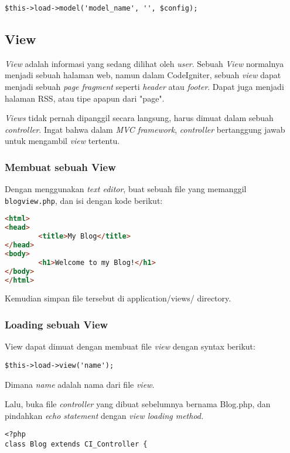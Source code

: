 \begin{enumerate}
\begin{lstlisting}[label=phpheg, frame=single]
$this->load->model('model_name', '', $config);
\end{lstlisting}


\subsection{View}
\label{subs:view}
\textit{View} adalah informasi yang sedang dilihat oleh \textit{user}. Sebuah \textit{View} normalnya menjadi sebuah halaman web, namun dalam CodeIgniter, sebuah \textit{view} dapat menjadi sebuah \textit{page fragment} seperti \textit{header} atau \textit{footer}. Dapat juga menjadi halaman RSS, atau tipe apapun dari "page".

\textit{Views} tidak pernah dipanggil secara langsung, harus dimuat dalam sebuah \textit{controller}. Ingat bahwa dalam \textit{MVC framework}, \textit{controller} bertanggung jawab untuk mengambil \textit{view} tertentu. 

\subsubsection{Membuat sebuah View}
\label{sssec:view_1}
Dengan menggunakan \textit{text editor}, buat sebuah file yang memanggil \verb|blogview.php|, dan isi dengan kode berikut:
\begin{lstlisting}[frame=single, language=html]% 
<html>
<head>
        <title>My Blog</title>
</head>
<body>
        <h1>Welcome to my Blog!</h1>
</body>
</html>
\end{lstlisting}

Kemudian simpan file tersebut di application/views/ directory.

\subsubsection{Loading sebuah View}
\label{sssec:view_1}

View dapat dimuat dengan membuat file \textit{view} dengan syntax berikut:

\begin{lstlisting}[frame=single] 
$this->load->view('name');
\end{lstlisting}

Dimana \textit{name} adalah nama dari file \textit{view}.

Lalu, buka file \textit{controller} yang dibuat sebelumnya bernama Blog.php, dan pindahkan \textit{echo statement} dengan \textit{view loading method.}

\begin{lstlisting}[label=phpheg, frame=single] 
<?php
class Blog extends CI_Controller {


\end{lstlisting}
\end{enumerate}
